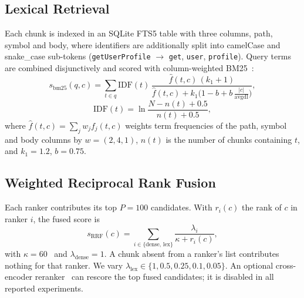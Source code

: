 \documentclass[conference]{IEEEtran}
\begin{document}
\subsection{Lexical Retrieval}
Each chunk is indexed in an SQLite FTS5 table with three columns, path, symbol
and body, where identifiers are additionally split into camelCase and
snake\_case sub-tokens (\texttt{getUserProfile} $\rightarrow$ \texttt{get},
\texttt{user}, \texttt{profile}). Query terms are combined disjunctively and
scored with column-weighted BM25~\cite{robertson2009bm25}:
\begin{equation}
  s_{\text{bm25}}(q,c) = \sum_{t \in q} \text{IDF}(t)\,
  \frac{\hat f(t,c)\,(k_1+1)}{\hat f(t,c) + k_1\bigl(1-b+b\,\tfrac{|c|}{\text{avgdl}}\bigr)},
\end{equation}
\begin{equation}
  \text{IDF}(t) = \ln\frac{N - n(t) + 0.5}{n(t) + 0.5},
\end{equation}
where $\hat f(t,c) = \sum_{j} w_j f_j(t,c)$ weights term frequencies of the path,
symbol and body columns by $w = (2, 4, 1)$, $n(t)$ is the number of chunks
containing $t$, and $k_1 = 1.2$, $b = 0.75$.

\subsection{Weighted Reciprocal Rank Fusion}
Each ranker contributes its top $P = 100$ candidates. With $r_i(c)$ the rank of
$c$ in ranker $i$, the fused score is
\begin{equation}
  s_{\text{RRF}}(c) = \sum_{i \in \{\text{dense},\,\text{lex}\}} \frac{\lambda_i}{\kappa + r_i(c)},
\end{equation}
with $\kappa = 60$~\cite{cormack2009rrf} and $\lambda_{\text{dense}} = 1$. A
chunk absent from a ranker's list contributes nothing for that ranker. We vary
$\lambda_{\text{lex}} \in \{1, 0.5, 0.25, 0.1, 0.05\}$. An optional cross-encoder
reranker~\cite{nogueira2019passage} can rescore the top fused candidates; it is
disabled in all reported experiments.
\end{document}
